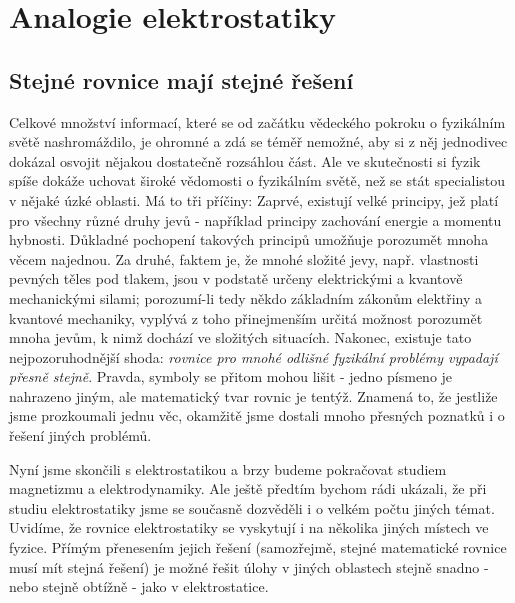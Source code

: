 \setchaptertoc
\chapter{Analogie elektrostatiky}\label{fyz:IIchapXII}  
  \section{Stejné rovnice mají stejné řešení}\label{fyz:IIchapXIIsecI}
    Celkové množství informací, které se od začátku vědeckého pokroku o fyzikálním světě
    nashromáždilo, je ohromné a zdá se téměř nemožné, aby si z něj jednodivec dokázal osvojit
    nějakou dostatečně rozsáhlou část. Ale ve skutečnosti si fyzik spíše dokáže uchovat široké
    vědomosti o fyzikálním světě, než se stát specialistou v nějaké úzké oblasti. Má to tři příčiny:
    Zaprvé, existují velké principy, jež platí pro všechny různé druhy jevů - například principy
    zachování energie a momentu hybnosti. Důkladné pochopení takových principů umožňuje porozumět
    mnoha věcem najednou. Za druhé, faktem je, že mnohé složité jevy, např. vlastnosti pevných těles
    pod tlakem, jsou v podstatě určeny elektrickými a kvantově mechanickými silami; porozumí-li tedy
    někdo základním zákonům elektřiny a kvantové mechaniky, vyplývá z toho přinejmenším určitá
    možnost porozumět mnoha jevům, k nimž dochází ve složitých situacích. Nakonec, existuje tato
    nejpozoruhodnější shoda: \emph{rovnice pro mnohé odlišné fyzikální problémy vypadají přesně
    stejně}. Pravda, symboly se přitom mohou lišit - jedno písmeno je nahrazeno jiným, ale
    matematický tvar rovnic je tentýž. Znamená to, že jestliže jsme prozkoumali jednu věc, okamžitě
    jsme dostali mnoho přesných poznatků i o řešení jiných problémů.

    Nyní jsme skončili s elektrostatikou a brzy budeme pokračovat studiem magnetizmu a
    elektrodynamiky. Ale ještě předtím bychom rádi ukázali, že při studiu elektrostatiky jsme se
    současně dozvěděli i o velkém počtu jiných témat. Uvidíme, že rovnice elektrostatiky se
    vyskytují i na několika jiných místech ve fyzice. Přímým přenesením jejich řešení (samozřejmě,
    stejné matematické rovnice musí mít stejná řešení) je možné řešit úlohy v jiných oblastech
    stejně snadno - nebo stejně obtížně - jako v elektrostatice.

